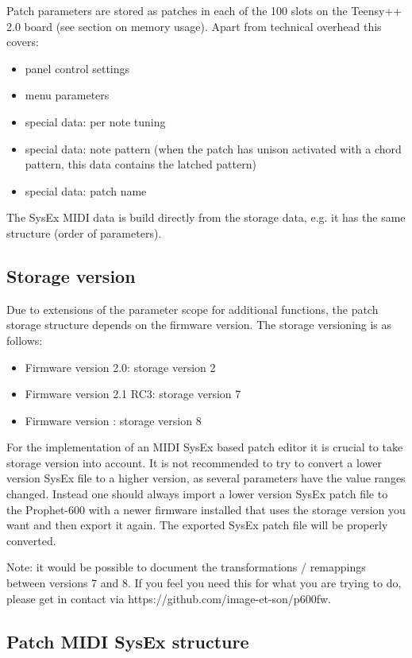Patch parameters are stored as patches in each of the 100 slots on the Teensy++ 2.0 board (see section on memory usage). Apart from technical overhead this covers:
\begin{itemize}
  \item panel control settings
  \item menu parameters
  \item special data: per note tuning
  \item special data: note pattern (when the patch has unison activated with a chord pattern, this data contains the latched pattern) 
  \item special data: patch name 
\end{itemize}

The SysEx MIDI data is build directly from the storage data, e.g. it has the same structure (order of parameters). 

\subsection{Storage version}

Due to extensions of the parameter scope for additional functions, the patch storage structure depends on the firmware version. The storage versioning is as follows:

\begin{itemize}
  \item Firmware version 2.0: storage version 2
  \item Firmware version 2.1 RC3: storage version 7
  \item Firmware version \version: storage version 8  
\end{itemize}

For the implementation of an MIDI SysEx based patch editor it is crucial to take storage version into account. It is not recommended to try to convert a lower version SysEx file to a higher version, as several parameters have the value ranges changed. Instead one should always import a lower version SysEx patch file to the Prophet-600 with a newer firmware installed that uses the storage version you want and then export it again. The exported SysEx patch file will be properly converted. 

Note: it would be possible to document the transformations / remappings between versions 7 and 8. If you feel you need this for what you are trying to do, please get in contact via https://github.com/image-et-son/p600fw.

\subsection{Patch MIDI SysEx structure}

